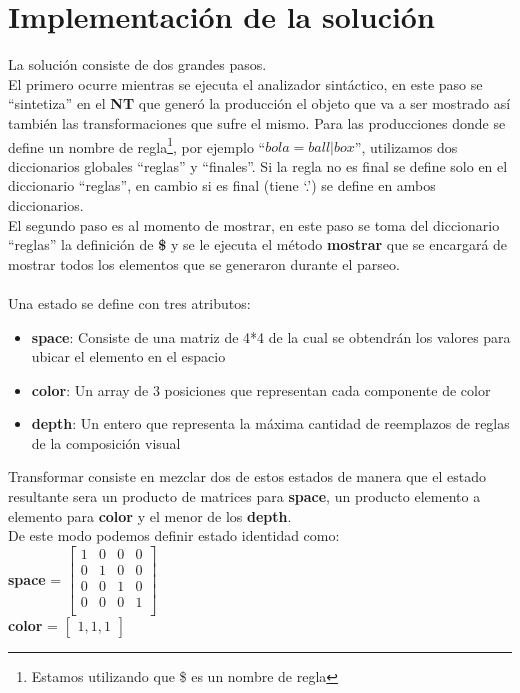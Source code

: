\documentclass[10pt,a4paper]{article}
\begin{document}
\section{Implementación de la solución}
La solución consiste de dos grandes pasos.\\
El primero ocurre mientras se ejecuta el analizador sintáctico, en este paso se ``sintetiza'' en el \textbf{NT} que generó la producción el objeto que va a ser mostrado así también las transformaciones que sufre el mismo.
Para las producciones donde se define un nombre de regla\footnote{Estamos utilizando que \$ es un nombre de regla}, por ejemplo ``$bola=ball|box$'', utilizamos dos diccionarios globales ``reglas'' y ``finales''. Si la regla no es final se define solo en el diccionario ``reglas'', en cambio si es final (tiene `.') se define en ambos diccionarios.\\
El segundo paso es al momento de mostrar, en este paso se toma del diccionario ``reglas'' la definición de \textbf{\$} y se le ejecuta el método \textbf{mostrar} que se encargará de mostrar todos los elementos que se generaron durante el parseo.\\
\\
Una estado se define con tres atributos: 
\begin{itemize}
\item{\textbf{space}: Consiste de una matriz de 4*4 de la cual se obtendrán los valores para ubicar el elemento en el espacio}
\item{\textbf{color}: Un array de 3 posiciones que representan cada componente de color}
\item{\textbf{depth}: Un entero que representa la máxima cantidad de reemplazos de  reglas de la composición visual}
\end{itemize}
Transformar consiste en mezclar dos de estos estados de manera que el estado resultante sera un producto de matrices para \textbf{space}, un producto elemento a elemento para \textbf{color} y el menor de los \textbf{depth}.\\
De este modo podemos definir estado identidad como:\\
\textbf{space} = $\begin{bmatrix}
1 & 0 & 0 & 0\\ 
0 & 1 & 0 & 0\\ 
0 & 0 & 1 & 0\\ 
0 & 0 & 0 & 1\\
\end{bmatrix}$\\
\textbf{color} = $\begin{bmatrix}1, 1 ,1\end{bmatrix}$\\
\end{document}
